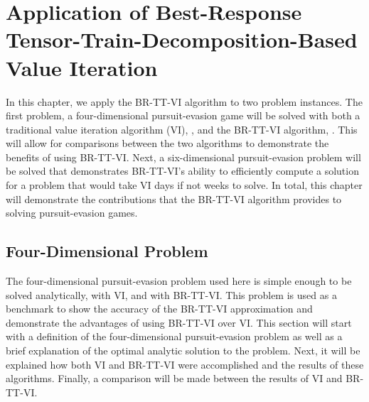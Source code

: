 \chapter{Application of Best-Response Tensor-Train-Decomposition-Based Value Iteration}\label{chp:examples}
In this chapter, we apply the BR-TT-VI algorithm to two problem instances. The first problem, a four-dimensional pursuit-evasion game will be solved with both a traditional value iteration algorithm (VI), , and the BR-TT-VI algorithm, . This will allow for comparisons between the two algorithms to demonstrate the benefits of using BR-TT-VI. Next, a six-dimensional pursuit-evasion problem will be solved that demonstrates BR-TT-VI's ability to efficiently compute a solution for a problem that would take VI days if not weeks to solve. In total, this chapter will demonstrate the contributions that the BR-TT-VI algorithm provides to solving pursuit-evasion games.  

\section{Four-Dimensional Problem}
The four-dimensional pursuit-evasion problem used here is simple enough to be solved analytically, with VI, and with BR-TT-VI. This problem is used as a benchmark to show the accuracy of the BR-TT-VI approximation and demonstrate the advantages of using BR-TT-VI over VI. This section will start with a definition of the four-dimensional pursuit-evasion problem as well as a brief explanation of the optimal analytic solution to the problem. Next, it will be explained how both VI and BR-TT-VI were accomplished and the results of these algorithms. Finally, a comparison will be made between the results of VI and BR-TT-VI.   

